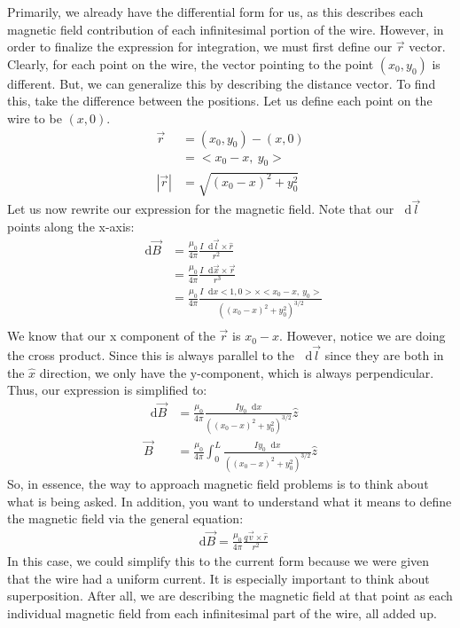 \documentclass{article}
\newcommand*\dif{\mathop{}\!\mathrm{d}}
\begin{document}
Primarily, we already have the differential form for us, as this describes each magnetic field contribution of each infinitesimal portion of the wire. However, in order to finalize the expression for integration, we must first define our $\vec{r}$ vector. Clearly, for each point on the wire, the vector pointing to the point $(x_0, y_0)$ is different. But, we can generalize this by describing the distance vector. To find this, take the difference between the positions. Let us define each point on the wire to be $(x,0)$.
\begin{align*}
\vec{r} &= (x_0, y_0) - (x, 0)\\
&= <x_0-x,\ y_0>\\
|\vec{r}| &= \sqrt{(x_0-x)^2 + y_0^2}
\end{align*}
Let us now rewrite our expression for the magnetic field. Note that our $\dif \vec{l}$ points along the x-axis:
\begin{align*}
\dif \vec{B} &= \frac{\mu_0}{4\pi}\frac{I\dif\vec{l}\times\hat{r}}{r^2}\\
&= \frac{\mu_0}{4\pi}\frac{I\dif\vec{x}\times\vec{r}}{r^3}\\
&= \frac{\mu_0}{4\pi}\frac{I\dif x <1, 0>\times <x_0 - x, \ y_0>}{((x_0-x)^2 + y_0^2)^{3/2}}\\
\end{align*}
We know that our x component of the $\vec{r}$ is $x_0-x$. However, notice we are doing the cross product. Since this is always parallel to the $\dif \vec{l}$ since they are both in the $\hat{x}$ direction, we only have the y-component, which is always perpendicular. Thus, our expression is simplified to:
\begin{align*}
\dif \vec{B} &= \frac{\mu_0}{4\pi}\frac{Iy_0\dif x}{((x_0-x)^2 + y_0^2)^{3/2}}\hat{z}\\
\vec{B} &= \frac{\mu_0}{4\pi}\int_0^L \frac{Iy_0\dif x}{((x_0-x)^2 + y_0^2)^{3/2}}\hat{z}
\end{align*}
So, in essence, the way to approach magnetic field problems is to think about what is being asked. In addition, you want to understand what it means to define the magnetic field via the general equation:
\begin{align*}
\dif \vec{B} = \frac{\mu_0}{4\pi}\frac{q\vec{v}\times\hat{r}}{r^2}
\end{align*}
In this case, we could simplify this to the current form because we were given that the wire had a uniform current. It is especially important to think about superposition. After all, we are describing the magnetic field at that point as each individual magnetic field from each infinitesimal part of the wire, all added up.\\
\end{document}

